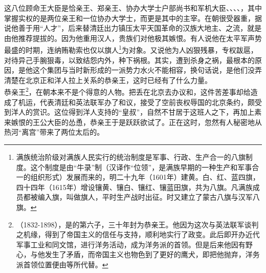 这八位顾命王大臣是恰亲王、郑亲王、协办大学士户部尚书和军机大臣、、、、，其中掌握实权的是两位亲王和一位协办大学士，而更是其中的主宰。在朝很受器重，据说他善于用“人才”，后来替清廷出力镇压太平天国革命的汉族大地主、之流，就是由他推荐提拔的。因为他重用汉人，贵族们对他极其嫉恨。有人说他在太平军声势最盛的时期，连纳贿勒索也仅以旗人\footnote{满族统治阶级对满族人民实行的统治制度是军事、行政、生产合一的八旗制度。这个制度是由“牛录”制（汉译作“位领”，是满族早期的一种生产和军事合一的组织形式）发展而来的，明二十九年（1601年）建黄。白、红、蓝四旗，四十四年（1615年）增设镶黄、镶白、镶红、镶蓝田旗，共为八旗。凡满族成员都被编入旗，叫做旗人，平时生产战时出征。时又建立了蒙古八旗与汉军八旗。}为对象。又说他为人凶狠残暴，专权跋扈，对待异己手腕狠毒，以致结怨内外，种下祸根。其实，遭到杀身之祸，最根本的原因，是他这个集团与当时新形成的一派势力水火不能相容，换句话说，是他们没弄清楚在北京正和洋人拉上关系的恭亲王，这时已经有了什么力量。\\

恭亲王\footnote{（1832-1898），是的第六子，三十年封为恭亲王。他因为这次与英法联军谈判之机缘，得到了帝国主义的信任与支持，顺利地实行了政变。此后即开办近代军事工业和同文馆，进行洋务活动，成为洋务派的首领。但是后来他因有野心，与他发生了矛盾，而帝国主义也物色到了更好的鹰犬，即把他抛弃，洋务派首领位置便由等所代替。}，在朝本来不是个得意的人物。把丢在北京去办议和，这件苦差事却给造成了机运，代表清廷和英法联军办了和议，接受了空前丧权辱国的北京条约，颇受到洋人的赏识。这位得到洋人支持的“皇叔”，自然不甘居于这班人之下，再加上素来嫉恨的王公大臣的怂恿，恭亲王于是跃跃欲试了。正在这时，忽然有人秘密地从热河“离宫”带来了两位太后的。\\

